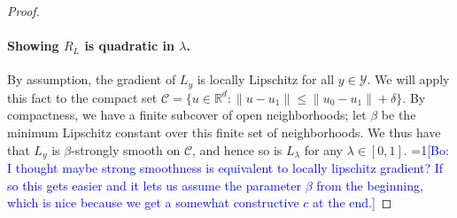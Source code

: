 \documentclass{article}
\theoremstyle{definition}\newtheorem{definition}{Definition}
\theoremstyle{definition}\newtheorem{assumption}{Assumption}
\newcommand{\Comments}{1}
\newcommand{\mynote}[2]{\ifnum\Comments=1\textcolor{#1}{#2}\fi}
\newcommand{\bo}[1]{\mynote{blue}{[Bo: #1]}}
\newcommand{\reals}{\mathbb{R}}
\newcommand{\Y}{\mathcal{Y}}
\begin{document}
\begin{proof}
  \paragraph{Showing $R_L$ is quadratic in $\lambda$.}
  By assumption, the gradient of $L_y$ is locally Lipschitz for all $y\in\Y$.
  We will apply this fact to the compact set $\mathcal C = \{u \in \reals^d : \|u - u_1\| \leq \|u_0 - u_1\| + \delta\}$.
  By compactness, we have a finite subcover of open neighborhoods; let $\beta$ be the minimum Lipschitz constant over this finite set of neighborhoods.
  We thus have that $L_y$ is $\beta$-strongly smooth on $\mathcal C$, and hence so is $L_\lambda$ for any $\lambda \in [0,1]$.
  \bo{I thought maybe strong smoothness is equivalent to locally lipschitz gradient? If so this gets easier and it lets us assume the parameter $\beta$ from the beginning, which is nice because we get a somewhat constructive $c$ at the end.}
  

\end{proof}
\end{document}
